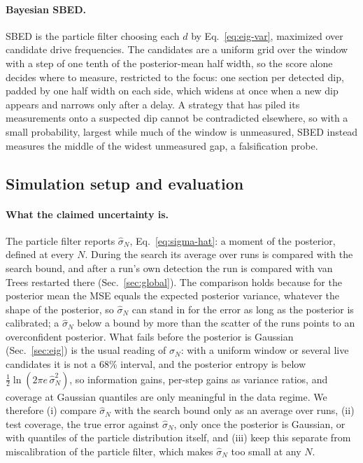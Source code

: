 \paragraph{Bayesian SBED.} SBED is the particle filter choosing each $d$ by Eq.~\eqref{eq:eig-var}, maximized over
candidate drive frequencies. The candidates are a uniform grid over the window with a step of one tenth of the
posterior-mean half width, so the score alone decides where to measure, restricted to the focus: one section per detected dip, padded by one half width on each side, which
widens at once when a new dip appears and narrows only after a delay. A strategy that has piled its measurements onto
a suspected dip cannot be contradicted elsewhere, so with a small probability, largest while much of the window is
unmeasured, SBED instead measures the middle of the widest unmeasured gap, a falsification probe.

\subsection{Simulation setup and evaluation}
\label{sec:protocol}

\paragraph{What the claimed uncertainty is.} The particle filter reports $\hat\sigma_N$, Eq.~\eqref{eq:sigma-hat}: a moment of the
posterior, defined at every $N$. During the search its average over runs is compared with the search bound, and
after a run's own detection the run is compared with van Trees restarted there (Sec.~\ref{sec:global}). The comparison
holds because for the posterior mean the MSE equals the expected posterior variance, whatever the shape of the
posterior, so $\hat\sigma_N$ can stand in for the error as long as the posterior is calibrated; a $\hat\sigma_N$ below
a bound by more than the scatter of the runs points to an overconfident posterior. What fails before the posterior is Gaussian
(Sec.~\ref{sec:eig}) is the usual reading of $\hat\sigma_N$: with a uniform window or several live
candidates it is not a 68\% interval, and the posterior entropy is below $\tfrac12\ln(2\pi e\,\hat\sigma_N^2)$, so
information gains, per-step gains as variance ratios, and coverage at Gaussian quantiles are only meaningful in the
data regime. We therefore (i) compare $\hat\sigma_N$ with the search bound only as an average over runs, (ii) test coverage,
the true error against $\hat\sigma_N$, only once the posterior is Gaussian, or with quantiles of the particle
distribution itself, and (iii) keep this separate from miscalibration of the particle filter, which makes
$\hat\sigma_N$ too small at any $N$.

